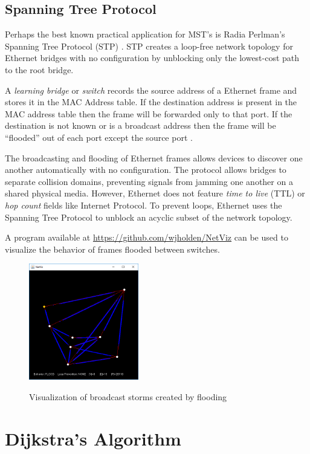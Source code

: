 \documentclass{book}
\begin{document}
\section{Spanning Tree Protocol}

Perhaps the best known practical application for MST's is Radia Perlman's Spanning Tree Protocol (STP) \cite{Perlman:1985:ADC:318951.319004}. STP creates a loop-free network topology for Ethernet bridges with no configuration by unblocking only the lowest-cost path to the root bridge.

A \textit{learning bridge} or \textit{switch} records the source address of a Ethernet frame and stores it in the MAC Address table. If the destination address is present in the MAC address table then the frame will be forwarded only to that port. If the destination is not known or is a broadcast address then the frame will be ``flooded'' out of each port except the source port \cite{perlman2000interconnections}.

The broadcasting and flooding of Ethernet frames allows devices to discover one another automatically with no configuration. The protocol allows bridges to separate collision domains, preventing signals from jamming one another on a shared physical media. However, Ethernet does not feature \textit{time to live} (TTL) or \textit{hop count} fields like Internet Protocol. To prevent loops, Ethernet uses the Spanning Tree Protocol to unblock an acyclic subset of the network topology.

A program available at \url{https://github.com/wjholden/NetViz} can be used to visualize the behavior of frames flooded between switches.

\begin{figure}[ht]
\centering
\includegraphics[height=2in]{ch-spann/netviz}
\label{netviz}
\caption{Visualization of broadcast storms created by flooding}
\end{figure}

\chapter{Dijkstra's Algorithm}
\end{document}
